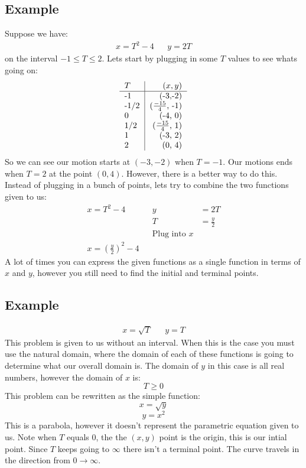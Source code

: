 \documentclass{report}
\begin{document}
    \subsection{Example}
        Suppose we have:
        \begin{align*}
            x = T^2 - 4 &&
            y = 2T
        \end{align*}
        on the interval \(-1 \leq T \leq 2\).
        Lets start by plugging in some \(T\) values to see whats going on:
        \begin{align*}
            \begin{tabular}{l | r}
                \(T\) & \((x, y)\) \\
                \hline
                -1 & (-3,-2) \\
                -1/2 & (\(\frac{-15}{4}\), -1) \\
                0 & (-4, 0) \\
                1/2 & (\(\frac{-15}{4}\), 1)\\
                1 & (-3, 2) \\
                2 & (0, 4)
            \end{tabular}
        \end{align*}
        So we can see our motion starts at \((-3, -2)\) when \(T = -1\).
        Our motions ends when \(T = 2\) at the point \((0, 4)\).
        However, there is a better way to do this.
        Instead of plugging in a bunch of points, lets try to combine the two functions given to us:
        \begin{align*}
            x = T^2 - 4 &&
            y &= 2T \\
            && T &= \frac{y}{2} \\
            && \text{Plug into \(x\)} \\
            x = \left( \frac{y}{2} \right)^2 - 4
        \end{align*}
        A lot of times you can express the given functions as a single function in terms of \(x\) and \(y\), however
        you still need to find the initial and terminal points.
    
    \subsection{Example}
        \begin{align*}
            x = \sqrt{T} &&
            y = T
        \end{align*}
        This problem is given to us without an interval. 
        When this is the case you must use the natural domain, where the domain of each of these functions is going to determine what our overall domain is.
        The domain of \(y\) in this case is all real numbers, however the domain of \(x\) is:
        \[T \geq 0\]
        This problem can be rewritten as the simple function:
        \[x = \sqrt{y}\]
        \[y = x^2\]
        This is a parabola, however it doesn't represent the parametric equation given to us.
        Note when \(T\) equals 0, the the \((x, y)\) point is the origin, this is our intial point.
        Since \(T\) keeps going to \(\infty\) there isn't a terminal point.
        The curve travels in the direction from \(0 \to \infty\).
    
\end{document}
